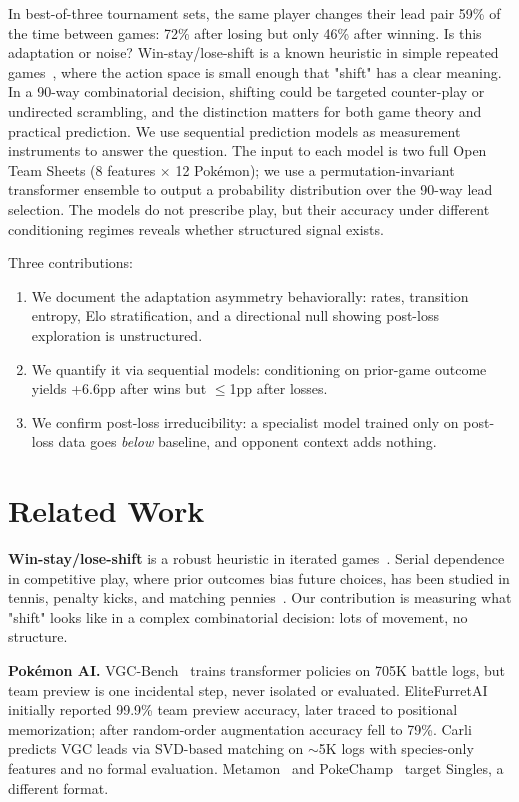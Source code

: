 \documentclass{article}
\begin{document}
In best-of-three tournament sets, the same player changes their lead pair 59\% of the time between games: 72\% after losing but only 46\% after winning.
Is this adaptation or noise?
Win-stay/lose-shift is a known heuristic in simple repeated games~\cite{nowak1993}, where the action space is small enough that "shift" has a clear meaning.
In a 90-way combinatorial decision, shifting could be targeted counter-play or undirected scrambling, and the distinction matters for both game theory and practical prediction.
We use sequential prediction models as measurement instruments to answer the question.
The input to each model is two full Open Team Sheets (8 features $\times$ 12 Pok\'emon); we use a permutation-invariant transformer ensemble to output a probability distribution over the 90-way lead selection.
The models do not prescribe play, but their accuracy under different conditioning regimes reveals whether structured signal exists.

Three contributions:
\begin{enumerate}
    \item We document the adaptation asymmetry behaviorally: rates, transition entropy, Elo stratification, and a directional null showing post-loss exploration is unstructured.
    \item We quantify it via sequential models: conditioning on prior-game outcome yields +6.6pp after wins but ${\leq}$1pp after losses.
    \item We confirm post-loss irreducibility: a specialist model trained only on post-loss data goes \emph{below} baseline, and opponent context adds nothing.
\end{enumerate}


\section{Related Work}
\label{sec:related}

\textbf{Win-stay/lose-shift} is a robust heuristic in iterated games~\cite{nowak1993}.
Serial dependence in competitive play, where prior outcomes bias future choices, has been studied in tennis, penalty kicks, and matching pennies~\cite{walker2001}.
Our contribution is measuring what "shift" looks like in a complex combinatorial decision: lots of movement, no structure.

\textbf{Pok\'emon AI.}
VGC-Bench~\cite{vgcbench} trains transformer policies on 705K battle logs, but team preview is one incidental step, never isolated or evaluated.
EliteFurretAI~\cite{elitefurretai} initially reported 99.9\% team preview accuracy, later traced to positional memorization; after random-order augmentation accuracy fell to 79\%.
Carli~\cite{carli2025} predicts VGC leads via SVD-based matching on ${\sim}$5K logs with species-only features and no formal evaluation.
Metamon~\cite{metamon} and PokeChamp~\cite{pokechamp} target Singles, a different format.
\end{document}
